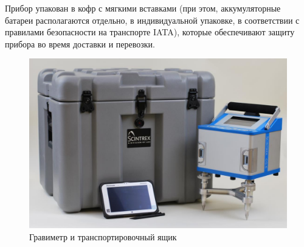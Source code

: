 Прибор \cg{} упакован в кофр с мягкими вставками (при
этом, аккумуляторные батареи располагаются отдельно, в индивидуальной упаковке,
в соответствии с правилами безопасности на транспорте IATA), которые
обеспечивают защиту прибора во время доставки и перевозки.


\begin{figure}%
  \centering
  \includegraphics[width=\textwidth]{figures/the_cg6_autograv_gravity_meter_and_its_transportation_case}
  \caption{Гравиметр \cg{} и транспортировочный ящик}
  \label{fig:the_cg6_autograv_gravity_meter_and_its_transportation_case}
\end{figure}

